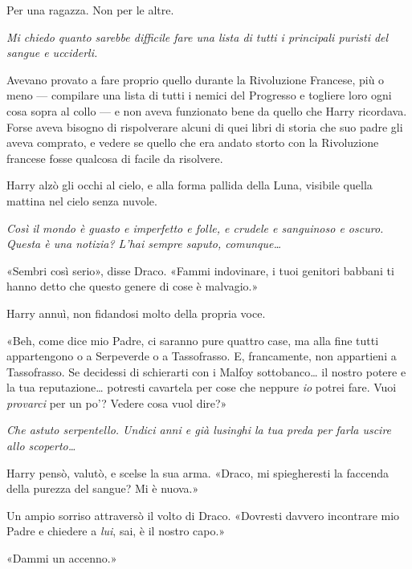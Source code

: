 Per una ragazza. Non per le altre.

\textit{Mi chiedo quanto sarebbe difficile fare una lista di tutti i principali puristi del sangue e ucciderli.}

Avevano provato a fare proprio quello durante la Rivoluzione Francese, più o meno — compilare una lista di tutti i nemici del Progresso e togliere loro ogni cosa sopra al collo — e non aveva funzionato bene da quello che Harry ricordava. Forse aveva bisogno di rispolverare alcuni di quei libri di storia che suo padre gli aveva comprato, e vedere se quello che era andato storto con la Rivoluzione francese fosse qualcosa di facile da risolvere.

Harry alzò gli occhi al cielo, e alla forma pallida della Luna, visibile quella mattina nel cielo senza nuvole.

\textit{Così il mondo è guasto e imperfetto e folle, e crudele e sanguinoso e oscuro. Questa è una notizia? L’hai sempre saputo, comunque…}

«Sembri così serio», disse Draco. «Fammi indovinare, i tuoi genitori babbani ti hanno detto che questo genere di cose è malvagio.»

Harry annuì, non fidandosi molto della propria voce.

«Beh, come dice mio Padre, ci saranno pure quattro case, ma alla fine tutti appartengono o a Serpeverde o a Tassofrasso. E, francamente, non appartieni a Tassofrasso. Se decidessi di schierarti con i Malfoy sottobanco… il nostro potere e la tua reputazione… potresti cavartela per cose che neppure \textit{io} potrei fare. Vuoi \textit{provarci} per un po’? Vedere cosa vuol dire?»

\textit{Che astuto serpentello. Undici anni e già lusinghi la tua preda per farla uscire allo scoperto…}

Harry pensò, valutò, e scelse la sua arma. «Draco, mi spiegheresti la faccenda della purezza del sangue? Mi è nuova.»

Un ampio sorriso attraversò il volto di Draco. «Dovresti davvero incontrare mio Padre e chiedere a \textit{lui}, sai, è il nostro capo.»

«Dammi un accenno.»

